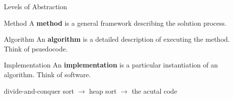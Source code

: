 \documentclass[10pt]{beamer}
\begin{document}
\begin{frame}{Levels of Abstraction}

\begin{block}{Method}
    A \textbf{method} is a general framework describing the solution process.
\end{block}
\begin{block}{Algorithm}
    An \textbf{algorithm} is a detailed description of executing the method. Think of psuedocode. 
\end{block}

\begin{block}{Implementation}
    An \textbf{implementation} is a particular instantiation of an algorithm. Think of software.  
\end{block}
\begin{center}
    divide-and-conquer sort $\rightarrow$ heap sort $\rightarrow$ the acutal code
\end{center}

\end{frame}
\end{document}
